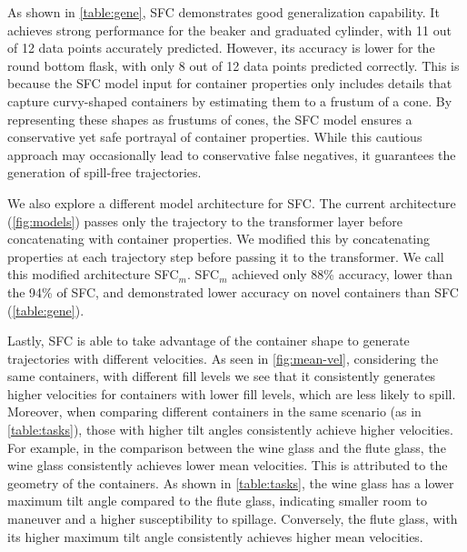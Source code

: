As shown in \cref{table:gene}, SFC demonstrates good generalization capability. It achieves strong performance for the beaker and graduated cylinder, with 11 out of 12 data points accurately predicted. However, its accuracy is lower for the round bottom flask, with only 8 out of 12 data points predicted correctly. This is because the SFC model input for container properties only includes details that capture curvy-shaped containers by estimating them to a frustum of a cone. By representing these shapes as frustums of cones, the SFC model ensures a conservative yet safe portrayal of container properties. While this cautious approach may occasionally lead to conservative false negatives, it guarantees the generation of spill-free trajectories.

We also explore a different model architecture for SFC. The current architecture (\cref{fig:models}) passes only the trajectory to the transformer layer before concatenating with container properties. We modified this by concatenating properties at each trajectory step before passing it to the transformer. We call this modified architecture SFC$_m$. SFC$_m$ achieved only 88\% accuracy, lower than the 94\% of SFC, and demonstrated lower accuracy on novel containers than SFC (\cref{table:gene}).

Lastly, SFC is able to take advantage of the container shape to generate trajectories with different velocities. As seen in \cref{fig:mean-vel}, considering the same containers, with different fill levels we see that it consistently generates higher velocities for containers with lower fill levels, which are less likely to spill. Moreover, when comparing different containers in the same scenario (as in \cref{table:tasks}), those with higher tilt angles consistently achieve higher velocities. For example, in the comparison between the wine glass and the flute glass, the wine glass consistently achieves lower mean velocities. This is attributed to the geometry of the containers. As shown in \cref{table:tasks}, the wine glass has a lower maximum tilt angle compared to the flute glass, indicating smaller room to maneuver and a higher susceptibility to spillage. Conversely, the flute glass, with its higher maximum tilt angle consistently achieves higher mean velocities.
